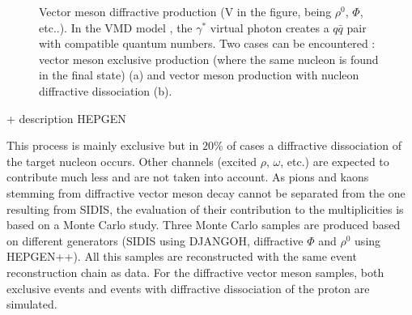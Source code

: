 \begin{figure}[!h]
{}
	\caption{Vector meson diffractive production (V in the figure, being $\rho^0$, $\Phi$, etc..). In the VMD model \cite{VMD}, the $\gamma^*$ virtual photon creates a $q\bar{q}$ pair with compatible quantum numbers. Two cases can be encountered : vector meson exclusive production (where the same nucleon is found in the final state) (a) and vector meson production with nucleon diffractive dissociation (b).}
	\label{pic:DVMprod}
\end{figure}

+ description HEPGEN

This process is mainly exclusive but in $20$\% of cases a diffractive dissociation of the target nucleon occurs. Other channels (excited $\rho$, $\omega$, etc.) are expected to contribute much less and are not taken into account. As pions and kaons stemming from diffractive vector meson decay cannot be separated from the one resulting from SIDIS, the evaluation of their contribution to the multiplicities is based on a Monte Carlo study. Three Monte Carlo samples are produced based on different generators (SIDIS using DJANGOH, diffractive $\Phi$ and $\rho^0$ using HEPGEN++). All this samples are reconstructed with the same event reconstruction chain as data. For the diffractive vector meson samples, both exclusive events and events with diffractive dissociation of the proton are simulated.

